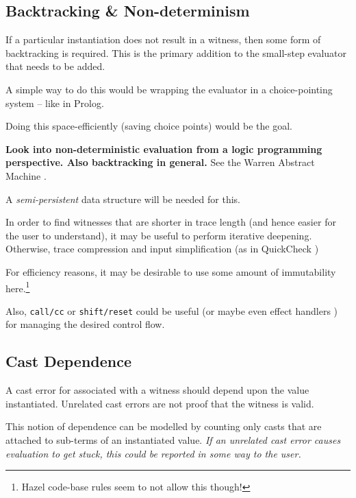 \subsection{Backtracking \& Non-determinism}
If a particular instantiation does not result in a witness, then some form of backtracking is required. This is the primary addition to the small-step evaluator that needs to be added.\par 
A simple way to do this would be wrapping the evaluator in a choice-pointing system -- like in Prolog. \par 
Doing this space-efficiently (saving choice points) would be the goal.\par 
\textbf{Look into non-deterministic evaluation from a logic programming perspective. Also backtracking in general.} See the Warren Abstract Machine \cite{WAM}.\par 
A \textit{semi-persistent} data structure \cite{SemiPersistent} will be needed for this.\par 
In order to find witnesses that are shorter in trace length (and hence easier for the user to understand), it may be useful to perform iterative deepening. Otherwise, trace compression and input simplification (as in QuickCheck \cite{QuickCheck})
\par 
For efficiency reasons, it may be desirable to use some amount of immutability here.\footnote{Hazel code-base rules seem to not allow this though!}\par
Also, \texttt{call/cc} or \texttt{shift/reset} could be useful (or maybe even effect handlers \cite{EffectsHaskell}) for managing the desired control flow.

\subsection{Cast Dependence}
A cast error for associated with a witness should depend upon the value instantiated. Unrelated cast errors are not proof that the witness is valid.\par 
This notion of dependence can be modelled by counting only casts that are attached to sub-terms of an instantiated value. \textit{If an unrelated cast error causes evaluation to get stuck, this could be reported in some way to the user.}\par 

